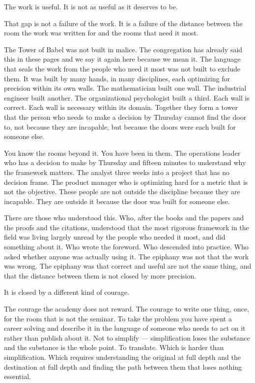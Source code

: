 The work is useful. It is not as useful as it deserves to be.

That gap is not a failure of the work. It is a failure of the distance between the room the work was written for and the rooms that need it most.

The Tower of Babel was not built in malice. The congregation has already said this in these pages and we say it again here because we mean it. The language that seals the work from the people who need it most was not built to exclude them. It was built by many hands, in many disciplines, each optimizing for precision within its own walls. The mathematician built one wall. The industrial engineer built another. The organizational psychologist built a third. Each wall is correct. Each wall is necessary within its domain. Together they form a tower that the person who needs to make a decision by Thursday cannot find the door to, not because they are incapable, but because the doors were each built for someone else.

You know the rooms beyond it. You have been in them. The operations leader who has a decision to make by Thursday and fifteen minutes to understand why the framework matters. The analyst three weeks into a project that has no decision frame. The product manager who is optimizing hard for a metric that is not the objective. These people are not outside the discipline because they are incapable. They are outside it because the door was built for someone else.

There are those who understood this. Who, after the books and the papers and the proofs and the citations, understood that the most rigorous framework in the field was living largely unread by the people who needed it most, and did something about it. Who wrote the foreword. Who descended into practice. Who asked whether anyone was actually using it. The epiphany was not that the work was wrong. The epiphany was that correct and useful are not the same thing, and that the distance between them is not closed by more precision.

It is closed by a different kind of courage.

The courage the academy does not reward. The courage to write one thing, once, for the room that is not the seminar. To take the problem you have spent a career solving and describe it in the language of someone who needs to act on it rather than publish about it. Not to simplify --- simplification loses the substance and the substance is the whole point. To translate. Which is harder than simplification. Which requires understanding the original at full depth and the destination at full depth and finding the path between them that loses nothing essential.

